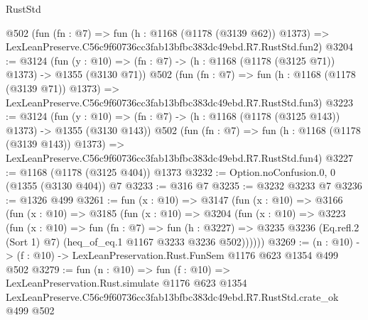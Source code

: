 \begin{lexlean}{RustStd}
\begin{coremodule}
    @502
    (fun (fn : @7) =>
    fun (h : @1168 (@1178 (@3139 @62)) @1373) =>
    LexLeanPreserve.C56c9f60736cc3fab13bfbc383dc49ebd.R7.RustStd.fun2)
@3204 := @3124
    (fun (y : @10) => (fn : @7) -> (h : @1168 (@1178 (@3125 @71)) @1373) -> @1355 (@3130 @71))
    @502
    (fun (fn : @7) =>
    fun (h : @1168 (@1178 (@3139 @71)) @1373) =>
    LexLeanPreserve.C56c9f60736cc3fab13bfbc383dc49ebd.R7.RustStd.fun3)
@3223 := @3124
    (fun (y : @10) => (fn : @7) -> (h : @1168 (@1178 (@3125 @143)) @1373) -> @1355 (@3130 @143))
    @502
    (fun (fn : @7) =>
    fun (h : @1168 (@1178 (@3139 @143)) @1373) =>
    LexLeanPreserve.C56c9f60736cc3fab13bfbc383dc49ebd.R7.RustStd.fun4)
@3227 := @1168 (@1178 (@3125 @404)) @1373
@3232 := Option.noConfusion.{0, 0} (@1355 (@3130 @404)) @7
@3233 := @316 @7
@3235 := @3232 @3233 @7
@3236 := @1326 @499
@3261 := fun (x : @10) =>
  @3147
    (fun (x : @10) =>
    @3166
      (fun (x : @10) =>
      @3185
        (fun (x : @10) =>
        @3204
          (fun (x : @10) =>
          @3223
            (fun (x : @10) =>
            fun (fn : @7) =>
            fun (h : @3227) =>
            @3235 @3236 (Eq.refl.{2} (Sort 1) @7) (heq_of_eq.{1} @1167 @3233 @3236 @502))))))
@3269 := (n : @10) -> (f : @10) -> LexLeanPreservation.Rust.FunSem @1176 @623 @1354 @499 @502
@3279 := fun (n : @10) =>
  fun (f : @10) =>
  LexLeanPreservation.Rust.simulate
    @1176
    @623
    @1354
    LexLeanPreserve.C56c9f60736cc3fab13bfbc383dc49ebd.R7.RustStd.crate_ok
    @499
    @502
\end{coremodule}
\end{lexlean}
